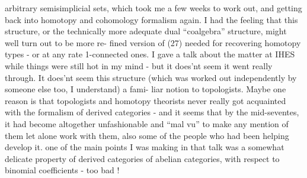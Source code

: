 arbitrary semisimplicial sets,  which took me a few weeks to work out,
and  getting back into homotopy and cohomology formalism again.  I had
the feeling that this structure,  or the technically more adequate
dual  ``coalgebra'' structure,  might well turn out to be  more re-%
fined version of (27)  needed for recovering homotopy types - 
or at any rate 1-connected ones.  I gave a talk about the matter at
IHES while things were still hot in my mind  -  but it does'nt seem
it went really through.   It does'nt seem this structure (which was
worked out independently by someone else too,  I understand)   a fami-%
liar notion to topologists.  Maybe one reason is that  topologists 
and homotopy theorists never really got acquainted with the formalism
of derived categories  -  and it seems that  by the mid-seventes,  it
had  become altogether unfashionable and ``mal vu'' to make any mention of
them let alone work with them,   also   some of the people who
 had been helping  develop it.   one of the main
points I was making in that talk was a somewhat delicate property of
derived categories of abelian categories,  with respect to binomial
coefficients  -  too bad !

